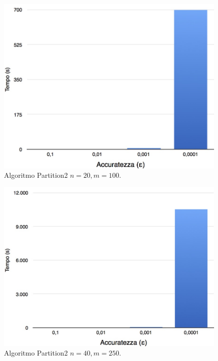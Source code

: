 \begin{figure}[!htb]
	\vspace*{1cm}
	\centering
	\includegraphics[scale=.3]{img/eps/20.jpg}
	\caption{Algoritmo Partition2 $n = 20, m = 100$.}
\end{figure}
\begin{figure}[!htb]
	\vspace*{1cm}
	\centering
	\includegraphics[scale=.3]{img/eps/40.jpg}
	\caption{Algoritmo Partition2 $n = 40, m = 250$.}
\end{figure}
